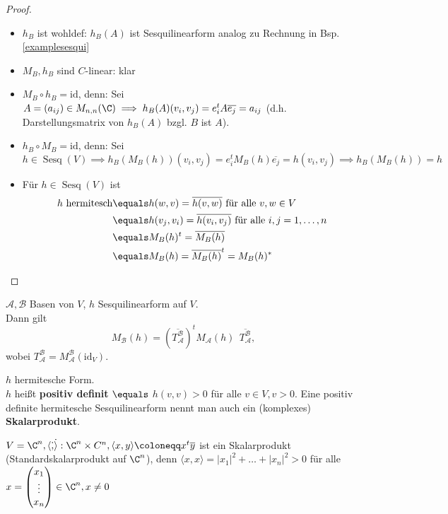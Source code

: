 \documentclass{article}
\begin{document}
    \begin{proof}\ 
        \begin{itemize}
            \item $h_B$ ist wohldef: $h_B(A)$ ist Sesquilinearform analog zu Rechnung in Bsp. \ref{examplesesqui}
            \item $M_B, h_B$ sind $C$-linear: klar
            \item $M_B \circ h_B = \mathrm{id}$, denn: 
            Sei $A = (a_{ij})\in M_{n,n} (\C) \implies h_B(A) (v_i, v_j) = e_i^t A\overline{e_j} = a_{ij}$ (d.h. Darstellungsmatrix von $h_B(A)$ bzgl. $B$ ist $A$).
            \item $h_B\circ M_B = \mathrm{id}$, denn: Sei $h\in \operatorname{Sesq}(V)\implies h_B(M_B(h))(v_i, v_j) = e_i^t M_B(h) \overline{e_j} = h(v_i, v_j) \implies h_B(M_B(h)) = h$
            \item Für $h \in \operatorname{Sesq}(V)$ ist 
            \begin{align*}
                h \text{ hermitesch} &\equals h(w,v) = \overline{h(v,w)} \text{ für alle } v,w \in V\\
                &\equals h(v_j, v_i) = \overline{h(v_i, v_j)} \text{ für alle $i, j=1,\dots, n$}\\
                &\equals M_B(h)^t = \overline{M_B(h)}\\
                &\equals M_B(h) = \overline{M_B(h)}^t = M_B(h)^*
            \end{align*}
        \end{itemize}
    \end{proof} 
    \begin{satz}
        $\mathcal{A}, \mathcal{B}$ Basen von $V$, $h$ Sesquilinearform auf $V$.\\
        Dann gilt $$M_\mathcal{B}(h) = \left(\overline{T_\mathcal{A}^\mathcal{B}}\right)^t M_\mathcal{A}(h)\ \ \overline{T^\mathcal{B}_\mathcal{A}} ,$$ wobei $T^\mathcal{B}_\mathcal{A} = M^\mathcal{B}_\mathcal{A}(\mathrm{id}_V)$.
    \end{satz}
    \begin{definition}
        $h$ hermitesche Form.\\
        $h$ heißt \textbf{positiv definit} $\equals$ $h(v,v) > 0$ für alle $v\in V, v > 0$.
        Eine positiv definite hermitesche Sesquilinearform nennt man auch ein (komplexes) \textbf{Skalarprodukt}.
    \end{definition}
    \begin{bsp}
        $V = \C^n, \langle \dot, \dot \rangle: \C^n \times C^n, \langle x, y\rangle \coloneqq x^t\overline{y}$ ist ein Skalarprodukt (Standardskalarprodukt auf $\C^n$), denn
        $\langle x, x \rangle = |x_1|^2 + \dots + |x_n| ^2 > 0$ für alle $x = \begin{pmatrix}
            x_1\\\vdots\\x_n
        \end{pmatrix} \in \C^n, x \neq 0$
    \end{bsp}
\end{document}
